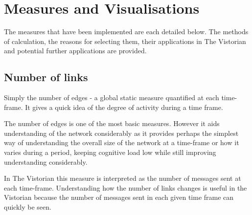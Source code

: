 \section{Measures and Visualisations}
The measures that have been implemented are each detailed below. The methods of calculation, the reasons for selecting them, their applications in The Vistorian and potential further applications are provided.

\subsection{Number of links}
Simply the number of edges - a global static measure quantified at each time-frame. It gives a quick idea of the degree of activity during a time frame.

The number of edges is one of the most basic measures. However it aids understanding of the network considerably as it provides perhaps the simplest way of understanding the overall size of the network at a time-frame or how it varies during a period, keeping cognitive load low while still improving understanding considerably.

In The Vistorian this measure is interpreted as the number of messages sent at each time-frame. 
Understanding how the number of links changes is useful in the Vistorian because the number of messages sent in each given time frame can quickly be seen.


